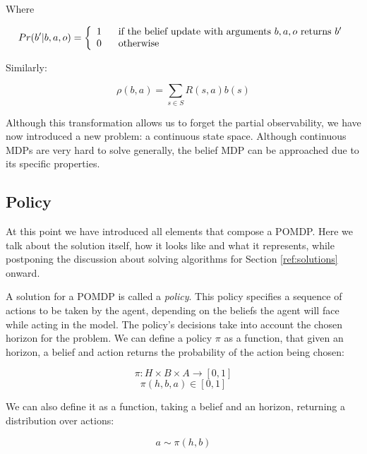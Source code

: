 Where

\[Pr(b' | b, a, o) = \left\{
  \begin{array}{lr}
    1 \hspace{.6cm}\text{if the belief update with arguments $b,a,o$ returns $b'$}\\
    0 \hspace{.6cm}\text{otherwise}
  \end{array}
\right.
\]

Similarly:

\[ \rho(b,a) = \sum_{s\in S} R(s,a) b(s) \]

Although this transformation allows us to forget the partial observability, we have now introduced a
new problem: a continuous state space. Although continuous MDPs are very hard to solve generally,
the belief MDP can be approached due to its specific properties.

\subsection{Policy}

At this point we have introduced all elements that compose a POMDP. Here we talk about the solution
itself, how it looks like and what it represents, while postponing the discussion about solving
algorithms for Section \ref{ref:solutions} onward.

A solution for a POMDP is called a \textit{policy}. This policy specifies a sequence of actions to
be taken by the agent, depending on the beliefs the agent will face while acting in the model. The
policy's decisions take into account the chosen horizon for the problem. We can define a policy
$\pi$ as a function, that given an horizon, a belief and action returns the probability of the action
being chosen:

\[ \pi : H \times B \times A \rightarrow [0,1] \]
\[ \pi(h, b, a) \in [0,1] \]

We can also define it as a function, taking a belief and an horizon, returning a distribution over
actions:

\[ a \sim \pi(h, b) \]

